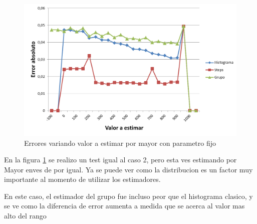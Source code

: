 	\begin{figure}[H]
	  \begin{center}
	    \includegraphics[scale=.40]{imagenes/C0_variando_valor_greater.png}
	    \caption{Errores variando valor a estimar por mayor con parametro fijo} 
	    \label{fig:C0_variando_valor_greater}
	  \end{center}
	\end{figure}	

		En la figura \ref{fig:C0_variando_valor_greater} se realizo un test igual al caso 2, pero esta ves estimando por Mayor enves de por igual. Ya se puede ver como la distribucion es un factor muy importante al momento de utilizar los estimadores.
		
		En este caso, el estimador del grupo fue incluso peor que el histograma clasico, y se ve como la diferencia de error aumenta a medida que se acerca al valor mas alto del rango